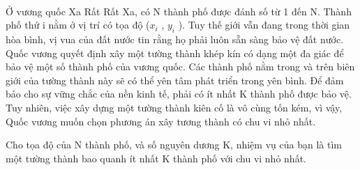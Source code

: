  

Ở vương quốc Xa Rất Rất Xa, có N thành phố được đánh số từ 1 đến N. Thành phố thứ i nằm ở vị trí có tọa độ ($x_{i}$ , $y_{i}$ ). Tuy thế giới vẫn đang trong thời gian hòa bình, vị vua của đất nước tin rằng họ phải luôn sẵn sàng bảo vệ đất nước. Quốc vương quyết định xây một tường thành khép kín có dạng một đa giác để bảo vệ một số thành phố của vương quốc. Các thành phố nằm trong và trên biên giới của tường thành này sẽ có thể yên tâm phát triển trong yên bình. Để đảm bảo cho sự vững chắc của nền kinh tế, phải có ít nhất K thành phố được bảo vệ. Tuy nhiên, việc xây dựng một tường thành kiên cố là vô cùng tốn kém, vì vậy, Quốc vương muốn chọn phương án xây tương thành có chu vi nhỏ nhất.

Cho tọa độ của N thành phố, và số nguyên dương K, nhiệm vụ của bạn là tìm một tường thành bao quanh ít nhất K thành phố với chu vi nhỏ nhất.